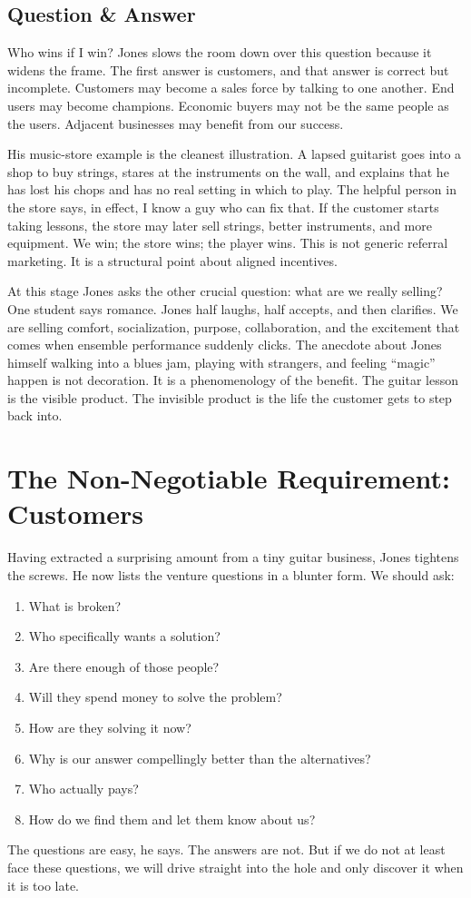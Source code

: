 \subsection{Question \& Answer}

Who wins if I win? Jones slows the room down over this question because it widens the frame. The first answer is customers, and that answer is correct but incomplete. Customers may become a sales force by talking to one another. End users may become champions. Economic buyers may not be the same people as the users. Adjacent businesses may benefit from our success.

His music-store example is the cleanest illustration. A lapsed guitarist goes into a shop to buy strings, stares at the instruments on the wall, and explains that he has lost his chops and has no real setting in which to play. The helpful person in the store says, in effect, I know a guy who can fix that. If the customer starts taking lessons, the store may later sell strings, better instruments, and more equipment. We win; the store wins; the player wins. This is not generic referral marketing. It is a structural point about aligned incentives.

At this stage Jones asks the other crucial question: what are we really selling? One student says romance. Jones half laughs, half accepts, and then clarifies. We are selling comfort, socialization, purpose, collaboration, and the excitement that comes when ensemble performance suddenly clicks. The anecdote about Jones himself walking into a blues jam, playing with strangers, and feeling ``magic'' happen is not decoration. It is a phenomenology of the benefit. The guitar lesson is the visible product. The invisible product is the life the customer gets to step back into.

\section{The Non-Negotiable Requirement: Customers}

Having extracted a surprising amount from a tiny guitar business, Jones tightens the screws. He now lists the venture questions in a blunter form. We should ask:
\begin{enumerate}
\item What is broken?
\item Who specifically wants a solution?
\item Are there enough of those people?
\item Will they spend money to solve the problem?
\item How are they solving it now?
\item Why is our answer compellingly better than the alternatives?
\item Who actually pays?
\item How do we find them and let them know about us?
\end{enumerate}
The questions are easy, he says. The answers are not. But if we do not at least face these questions, we will drive straight into the hole and only discover it when it is too late.

